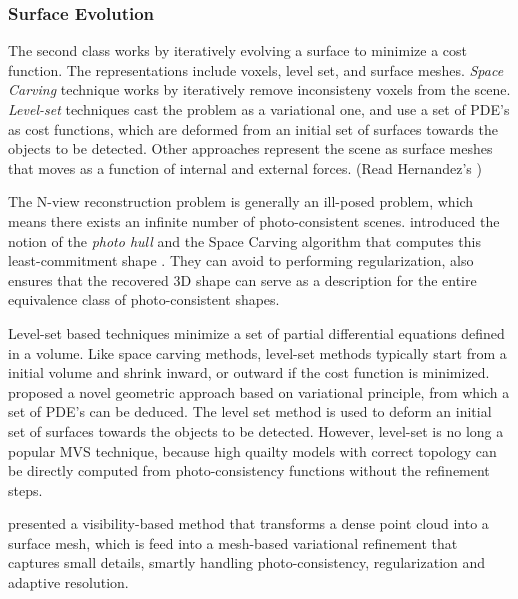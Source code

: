 
\subsubsection{Surface Evolution}
The second class works by iteratively evolving a surface to minimize a cost function. The representations include voxels, level set, and surface meshes. \textit{Space Carving} technique works by iteratively remove inconsisteny voxels from the scene. \textit{Level-set} techniques cast the problem as a variational one, and use a set of PDE's as cost functions, which are deformed from an initial set of surfaces towards the objects to be detected. Other approaches represent the scene as surface meshes that moves as a function of internal and external forces. (Read Hernandez's \cite{esteban2004silhouette})

The N-view reconstruction problem is generally an ill-posed problem, which means there exists an infinite number of photo-consistent scenes. \citeauthor{kutulakos2000theory} introduced the notion of the \textit{photo hull} and the Space 
Carving algorithm that computes this least-commitment shape \cite{marr1982vision}. They can avoid to performing regularization, also ensures that the recovered 3D shape can serve as a description for the entire equivalence class of photo-consistent shapes.

Level-set based techniques minimize a set of partial differential equations defined in a volume. Like space carving methods, level-set methods typically start from a initial volume and shrink inward, or outward if the cost function is minimized. \citeauthor{faugeras2002variational} proposed a novel geometric approach based on variational principle, from which a set of PDE's can be deduced. The level set method is used to deform an initial set of surfaces towards the objects to be detected. However, level-set is no long a popular MVS technique, because high quailty models with correct topology can be directly computed from photo-consistency functions without the refinement steps.

\citeauthor{hiep2009towards} presented a visibility-based method that transforms a dense point cloud into a surface mesh, which is feed into a mesh-based variational refinement that captures small details, smartly handling photo-consistency, regularization and adaptive resolution.

